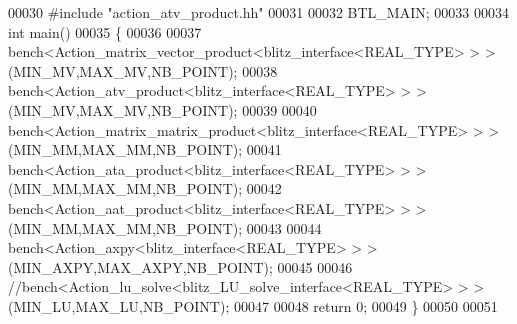 \begin{DoxyCode}
00030 \textcolor{preprocessor}{#include "action\_atv\_product.hh"}
00031 
00032 BTL\_MAIN;
00033 
00034 \textcolor{keywordtype}{int} main()
00035 \{
00036 
00037   bench<Action\_matrix\_vector\_product<blitz\_interface<REAL\_TYPE> > >(MIN\_MV,MAX\_MV,NB\_POINT);
00038   bench<Action\_atv\_product<blitz\_interface<REAL\_TYPE> > >(MIN\_MV,MAX\_MV,NB\_POINT);
00039 
00040   bench<Action\_matrix\_matrix\_product<blitz\_interface<REAL\_TYPE> > >(MIN\_MM,MAX\_MM,NB\_POINT);
00041   bench<Action\_ata\_product<blitz\_interface<REAL\_TYPE> > >(MIN\_MM,MAX\_MM,NB\_POINT);
00042   bench<Action\_aat\_product<blitz\_interface<REAL\_TYPE> > >(MIN\_MM,MAX\_MM,NB\_POINT);
00043 
00044   bench<Action\_axpy<blitz\_interface<REAL\_TYPE> > >(MIN\_AXPY,MAX\_AXPY,NB\_POINT);
00045 
00046   \textcolor{comment}{//bench<Action\_lu\_solve<blitz\_LU\_solve\_interface<REAL\_TYPE> > >(MIN\_LU,MAX\_LU,NB\_POINT);}
00047 
00048   \textcolor{keywordflow}{return} 0;
00049 \}
00050 
00051 
\end{DoxyCode}
